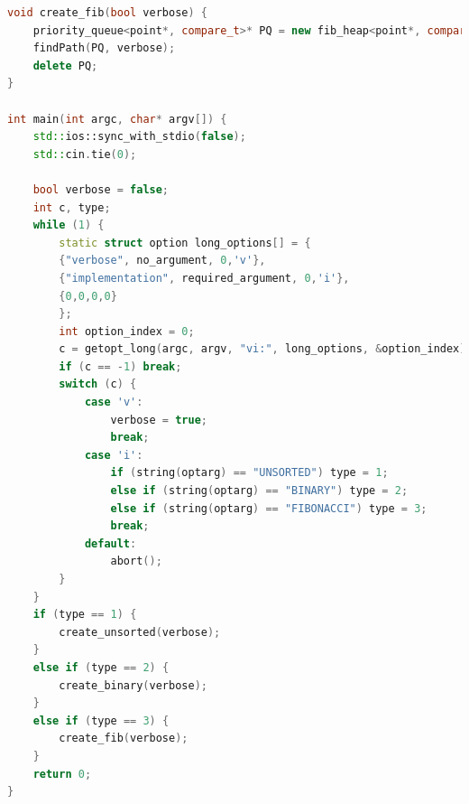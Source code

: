 \documentclass[a4paper]{article}
\begin{document}
\begin{lstlisting}[language=C++]
void create_fib(bool verbose) {
	priority_queue<point*, compare_t>* PQ = new fib_heap<point*, compare_t>;
	findPath(PQ, verbose);
	delete PQ;
}

int main(int argc, char* argv[]) {
	std::ios::sync_with_stdio(false);
	std::cin.tie(0);

	bool verbose = false;
	int c, type;
	while (1) {
		static struct option long_options[] = {
		{"verbose", no_argument, 0,'v'},
		{"implementation", required_argument, 0,'i'},
		{0,0,0,0}
		};
		int option_index = 0;
		c = getopt_long(argc, argv, "vi:", long_options, &option_index);
		if (c == -1) break;
		switch (c) {
			case 'v':
				verbose = true;
				break;
			case 'i':
				if (string(optarg) == "UNSORTED") type = 1;
				else if (string(optarg) == "BINARY") type = 2;
				else if (string(optarg) == "FIBONACCI") type = 3;
				break;
			default:
				abort();
		}
	}
	if (type == 1) {
		create_unsorted(verbose);
	}
	else if (type == 2) {
		create_binary(verbose);
	}
	else if (type == 3) {
		create_fib(verbose);
	}
	return 0;
}
\end{lstlisting}
\end{document}
